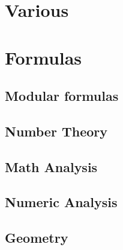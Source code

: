 \chapter{Various}





\chapter{Formulas}

\section{Modular formulas}


\section{Number Theory}




\section{Math Analysis}


\section{Numeric Analysis}



\section{Geometry}



